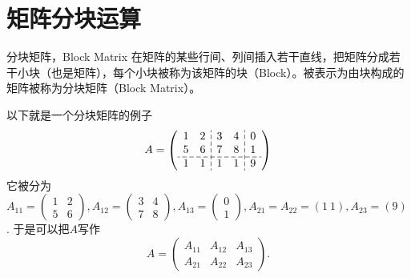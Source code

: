 
\section{矩阵分块运算}


\begin{frame}

\begin{block}{分块矩阵，Block Matrix}
在矩阵的某些行间、列间插入若干直线，把矩阵分成若干小块（也是矩阵），每个小块被称为该矩阵的块（Block）。被表示为由块构成的矩阵被称为分块矩阵（Block Matrix）。
\end{block}

\pause

以下就是一个分块矩阵的例子
\[
  \setlength{\dashlinegap}{2pt}
  A = \left( \begin{array}{cc:cc:c}
    1 & 2 & 3 & 4 & 0 \\
    5 & 6 & 7 & 8 & 1 \\
    \hdashline
    1 & 1 & 1 & 1 & 9 \\
  \end{array} \right)
\]
它被分为\(\displaystyle A_{11} = \begin{pmatrix}
1 & 2 \\ 5 & 6 \end{pmatrix}, A_{12} = \begin{pmatrix}
3 & 4 \\ 7 & 8 \end{pmatrix}, A_{13} = \begin{pmatrix}
0 \\ 1 \end{pmatrix}, A_{21} = A_{22} = (1 \ 1), A_{23} = (9)\). 于是可以把$A$写作
\[
A = \begin{pmatrix}
A_{11} & A_{12} & A_{13} \\ A_{21} & A_{22} & A_{23}
\end{pmatrix}.
\]

\end{frame}


